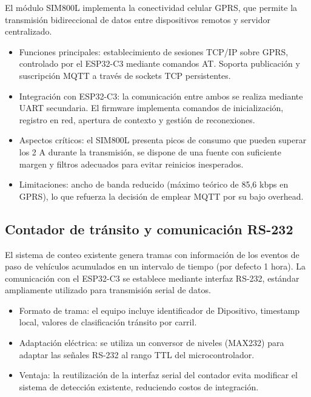 El módulo SIM800L implementa la conectividad celular GPRS, que permite la transmisión bidireccional de datos entre dispositivos remotos y servidor centralizado.


\begin{itemize}

\item Funciones principales: establecimiento de sesiones TCP/IP sobre GPRS, controlado por el ESP32-C3 mediante comandos AT. Soporta publicación y suscripción MQTT a través de sockets TCP persistentes.

\item Integración con ESP32-C3: la comunicación entre ambos se realiza mediante UART secundaria. El firmware implementa comandos de inicialización, registro en red, apertura de contexto y gestión de reconexiones.

\item Aspectos críticos: el SIM800L presenta picos de consumo que pueden superar los 2 A durante la transmisión, se  dispone de una fuente con suficiente margen y filtros adecuados para evitar reinicios inesperados.

\item Limitaciones: ancho de banda reducido (máximo teórico de 85,6 kbps en GPRS), lo que refuerza la decisión de emplear MQTT por su bajo overhead.

\end{itemize}


\subsection{Contador de tránsito y comunicación RS-232}

El sistema de conteo existente genera tramas con información de los eventos de paso de vehículos acumulados en un intervalo de tiempo (por defecto 1 hora). La comunicación con el ESP32-C3 se establece mediante interfaz RS-232, estándar ampliamente utilizado para transmisión serial de datos.

\begin{itemize}
\item Formato de trama:  el equipo incluye identificador de Dipositivo, timestamp local, valores de clasificación tránsito por carril.

\item Adaptación eléctrica: se utiliza un conversor de niveles (MAX232) para adaptar las señales RS-232 al rango TTL del microcontrolador.

\item Ventaja: la reutilización de la interfaz serial del contador evita modificar el sistema de detección existente, reduciendo costos de integración.


\end{itemize}


